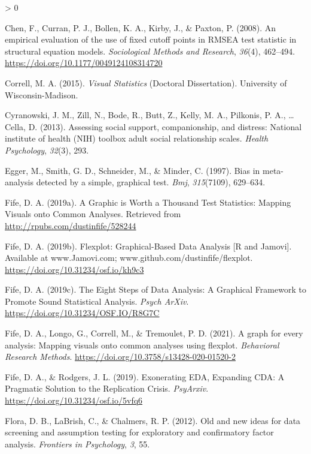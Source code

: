 \documentclass[
  english,
  man]{apa6}
\newlength{\cslhangindent}
\newenvironment{CSLReferences}[2] %
 {%
  \setlength{\parindent}{0pt}
  \ifodd #1 \everypar{\setlength{\hangindent}{\cslhangindent}}\ignorespaces\fi
  \ifnum #2 > 0
  \setlength{\parskip}{#2\baselineskip}
  \fi
 }%
 {}
\begin{document}
\begin{CSLReferences}{1}{0}
\leavevmode\hypertarget{ref-Chen2008}{}%
Chen, F., Curran, P. J., Bollen, K. A., Kirby, J., \& Paxton, P. (2008). {An empirical evaluation of the use of fixed cutoff points in RMSEA test statistic in structural equation models}. \emph{Sociological Methods and Research}, \emph{36}(4), 462--494. \url{https://doi.org/10.1177/0049124108314720}

\leavevmode\hypertarget{ref-Correll2015}{}%
Correll, M. A. (2015). \emph{{Visual Statistics}} (Doctoral Dissertation). University of Wisconsin-Madison.

\leavevmode\hypertarget{ref-cyranowski2013assessing}{}%
Cyranowski, J. M., Zill, N., Bode, R., Butt, Z., Kelly, M. A., Pilkonis, P. A., \ldots{} Cella, D. (2013). Assessing social support, companionship, and distress: National institute of health (NIH) toolbox adult social relationship scales. \emph{Health Psychology}, \emph{32}(3), 293.

\leavevmode\hypertarget{ref-egger1997bias}{}%
Egger, M., Smith, G. D., Schneider, M., \& Minder, C. (1997). Bias in meta-analysis detected by a simple, graphical test. \emph{Bmj}, \emph{315}(7109), 629--634.

\leavevmode\hypertarget{ref-Fife2019b}{}%
Fife, D. A. (2019a). {A Graphic is Worth a Thousand Test Statistics: Mapping Visuals onto Common Analyses}. Retrieved from \url{http://rpubs.com/dustinfife/528244}

\leavevmode\hypertarget{ref-Fife2019c}{}%
Fife, D. A. (2019b). {Flexplot: Graphical-Based Data Analysis {[}R and Jamovi{]}}. Available at www.Jamovi.com; www.github.com/dustinfife/flexplot. \url{https://doi.org/10.31234/osf.io/kh9c3}

\leavevmode\hypertarget{ref-Fife2019e}{}%
Fife, D. A. (2019c). {The Eight Steps of Data Analysis: A Graphical Framework to Promote Sound Statistical Analysis}. \emph{Psych ArXiv}. \url{https://doi.org/10.31234/OSF.IO/R8G7C}

\leavevmode\hypertarget{ref-Fifemapping}{}%
Fife, D. A., Longo, G., Correll, M., \& Tremoulet, P. D. (2021). A graph for every analysis: Mapping visuals onto common analyses using flexplot. \emph{Behavioral Research Methods}. \url{https://doi.org/10.3758/s13428-020-01520-2}

\leavevmode\hypertarget{ref-Fife2019a}{}%
Fife, D. A., \& Rodgers, J. L. (2019). {Exonerating EDA, Expanding CDA: A Pragmatic Solution to the Replication Crisis}. \emph{PsyArxiv}. \url{https://doi.org/10.31234/osf.io/5vfq6}

\leavevmode\hypertarget{ref-flora2012old}{}%
Flora, D. B., LaBrish, C., \& Chalmers, R. P. (2012). Old and new ideas for data screening and assumption testing for exploratory and confirmatory factor analysis. \emph{Frontiers in Psychology}, \emph{3}, 55.


\end{CSLReferences}
\end{document}
